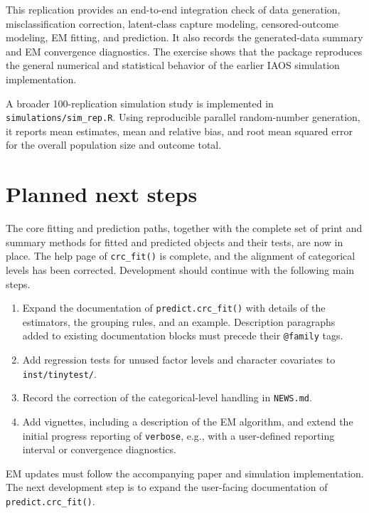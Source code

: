 \documentclass[11pt,letterpaper]{article}
\begin{document}
This replication provides an end-to-end integration check of data generation,
misclassification correction, latent-class capture modeling, censored-outcome
modeling, EM fitting, and prediction. It also records the generated-data
summary and EM convergence diagnostics. The exercise shows that the package
reproduces the general numerical and statistical behavior of the earlier IAOS
simulation implementation.

A broader 100-replication simulation study is implemented in
\texttt{simulations/sim\_rep.R}. Using reproducible parallel random-number
generation, it reports mean estimates, mean and relative bias, and root mean
squared error for the overall population size and outcome total.

\section{Planned next steps}

The core fitting and prediction paths, together with the complete set of
print and summary methods for fitted and predicted objects and their tests, are
now in place. The help page of \texttt{crc\_fit()} is complete, and the
alignment of categorical levels has been corrected. Development should
continue with the following main steps.

\begin{enumerate}
  \item Expand the documentation of \texttt{predict.crc\_fit()} with details
  of the estimators, the grouping rules, and an example. Description
  paragraphs added to existing documentation blocks must precede their
  \texttt{@family} tags.
  \item Add regression tests for unused factor levels and character
  covariates to \texttt{inst/tinytest/}.
  \item Record the correction of the categorical-level handling in
  \texttt{NEWS.md}.
  \item Add vignettes, including a description of the EM algorithm, and
  extend the initial progress reporting of \texttt{verbose}, e.g., with
  a user-defined reporting interval or convergence diagnostics.
\end{enumerate}

EM updates must follow the accompanying paper and simulation implementation.
The next development step is to expand the user-facing documentation of
\texttt{predict.crc\_fit()}.
\end{document}
